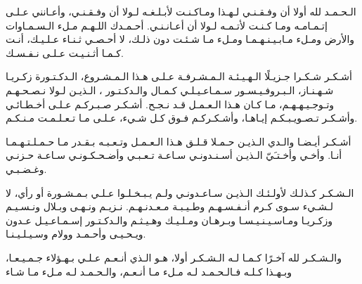 \begin{center}
    {%
        \Large\bfseries
    }
\end{center}

\begin{RLtext}
    الـحـمـد لله أولا أن وفـقـنـي لـهـذا ومـاكـنـت لأبـلـغـه لـولا أن وفـقـنـي،
    وأعـانني عـلـى إتـمـامـه ومـا كـنـت لأتـمـه لـولا أن أعـانـنـي.
    أحـمـدك اللـهـم مـلء الـسـمـاوات والأرض ومـلء مـابـيـنـهـمـا ومـلء مـا شـئـت دون ذلـك،
    لا أحـصـي ثـنـاء عـلـيـك، أنـت كـمـا أثـنـيـت عـلـى نـفـسـك.

    أشـكـر شـكـرا جـزيـلًا الـهـيـئـة الـمـشـرفـة عـلـى هـذا الـمـشـروع،
    الـدكـتـورة زكـريـا شـهـنـاز، الـبـروفـيـسـور سـمـاعـيـلـي كـمـال والـدكـتـور ،
    الـذيـن لـولا نـصـحـهـم وتـوجـيـهـهـم، مـا كـان هـذا الـعـمـل قـد نـجـح.
    أشـكـر صـبـركـم عـلـى أخـطـائـي وأشـكـر تـصـويـبـكـم إيـاهـا،
    وأشـكـركـم فـوق كـل شـيء، عـلـى مـا تـعـلـمـت مـنـكـم.

    أشـكـر أيـضـا والـدي الـذيـن حـمـلا قـلـق هـذا الـعـمـل وتـعـبـه بـقـدر مـا حـمـلـتـهـمـا أنـا.
    وأخـي وأخـتـَيّ الـذيـن أسـنـدونـي سـاعـة تـعـبـي وأضـحـكـونـي سـاعـة حـزنـي وغـضـبـي.

    الـشـكـر كـذلـك لأولـئـك الـذيـن سـاعـدونـي ولـم يـبـخـلـوا عـلـي بـمـشـورة أو رأي،
    لا لـشـيء سـوى كـرم أنـفـسـهـم وطـيـبـة مـعـدنـهـم.
    نـزيـم ونـهـى وبـلال ونـسـيـم وزكـريـا ومـاسـيـنـيـسـا وبـرهـان ومـلـيـك وهـيـثـم والـدكـتـور إسـمـاعـيـل عـدون
    ويـحـيـى وأحـمـد وولام وسـيـلـيـنـا.

    والـشـكـر لله آخـرًا كـمـا لـه الـشـكـر أولا،
    هـو الـذي أنـعـم عـلـي بـهـؤلاء جـمـيـعـا، وبـهـذا كـلـه
    فـالـحـمـد لـه مـلء مـا أنـعـم، والـحـمـد لـه مـلء مـا شـاء
\end{RLtext}
